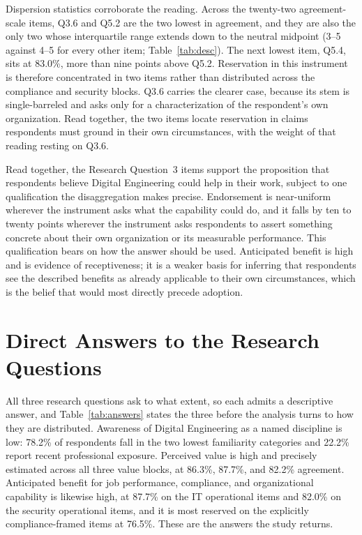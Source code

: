 Dispersion statistics corroborate the reading. Across the twenty-two agreement-scale items, Q3.6 and Q5.2 are the two lowest in agreement, and they are also the only two whose interquartile range extends down to the neutral midpoint (3--5 against 4--5 for every other item; Table~\ref{tab:desc}). The next lowest item, Q5.4, sits at 83.0\%, more than nine points above Q5.2. Reservation in this instrument is therefore concentrated in two items rather than distributed across the compliance and security blocks. Q3.6 carries the clearer case, because its stem is single-barreled and asks only for a characterization of the respondent's own organization. Read together, the two items locate reservation in claims respondents must ground in their own circumstances, with the weight of that reading resting on Q3.6.

Read together, the Research Question~3 items support the proposition that respondents believe Digital Engineering could help in their work, subject to one qualification the disaggregation makes precise. Endorsement is near-uniform wherever the instrument asks what the capability could do, and it falls by ten to twenty points wherever the instrument asks respondents to assert something concrete about their own organization or its measurable performance. This qualification bears on how the answer should be used. Anticipated benefit is high and is evidence of receptiveness; it is a weaker basis for inferring that respondents see the described benefits as already applicable to their own circumstances, which is the belief that would most directly precede adoption.

\section{Direct Answers to the Research Questions}

All three research questions ask to what extent, so each admits a descriptive answer, and Table~\ref{tab:answers} states the three before the analysis turns to how they are distributed. Awareness of Digital Engineering as a named discipline is low: 78.2\% of respondents fall in the two lowest familiarity categories and 22.2\% report recent professional exposure. Perceived value is high and precisely estimated across all three value blocks, at 86.3\%, 87.7\%, and 82.2\% agreement. Anticipated benefit for job performance, compliance, and organizational capability is likewise high, at 87.7\% on the IT operational items and 82.0\% on the security operational items, and it is most reserved on the explicitly compliance-framed items at 76.5\%. These are the answers the study returns.


